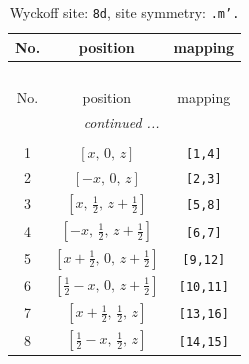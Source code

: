 \documentclass[fleqn,8pt]{jsarticle}
\begin{document}
\begin{longtable}{ccc}
\caption{Wyckoff site: {\tt 8d}, site symmetry: {\tt .m'.}}
 \\
 \hline \hline
No. & position & mapping \\ \hline \endfirsthead

\multicolumn{2}{l}{\tablename\ \thetable{}} \\
 \hline \hline
No. & position & mapping \\ \hline \endhead

 \hline \hline
\multicolumn{2}{r}{\footnotesize\it continued ...} \\ \endfoot

 \hline \hline
\multicolumn{2}{r}{} \\ \endlastfoot

1 & $\left[ x,\, 0,\, z \right]$ & {\tt [1,4]} \\ \hline
2 & $\left[ - x,\, 0,\, z \right]$ & {\tt [2,3]} \\ \hline
3 & $\left[ x,\, \frac{1}{2},\, z + \frac{1}{2} \right]$ & {\tt [5,8]} \\ \hline
4 & $\left[ - x,\, \frac{1}{2},\, z + \frac{1}{2} \right]$ & {\tt [6,7]} \\ \hline
5 & $\left[ x + \frac{1}{2},\, 0,\, z + \frac{1}{2} \right]$ & {\tt [9,12]} \\ \hline
6 & $\left[ \frac{1}{2} - x,\, 0,\, z + \frac{1}{2} \right]$ & {\tt [10,11]} \\ \hline
7 & $\left[ x + \frac{1}{2},\, \frac{1}{2},\, z \right]$ & {\tt [13,16]} \\ \hline
8 & $\left[ \frac{1}{2} - x,\, \frac{1}{2},\, z \right]$ & {\tt [14,15]} \\
\end{longtable}
\renewcommand{\arraystretch}{1.2}
\end{document}
